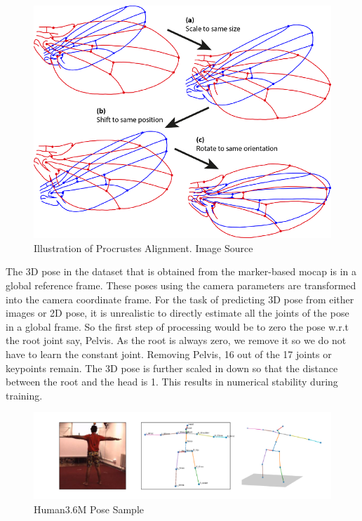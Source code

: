 \begin{figure}[!h]
    \centering
    \includegraphics[scale=0.8]{figures/background/Procrustes_superimposition.png}
    \caption{Illustration of Procrustes Alignment. Image Source \cite{Procrustes}}
    \label{fig:procrustes}
\end{figure}


The 3D pose in the dataset that is obtained from the marker-based \ac{mocap} is in a global reference frame. These poses using the camera parameters are transformed into the camera coordinate frame. For the task of predicting 3D pose from either images or 2D pose, it is unrealistic to directly estimate all the joints of the pose in a global frame. So the first step of processing would be to zero the pose w.r.t the root joint say, Pelvis. As the root is always zero, we remove it so we do not have to learn the constant joint. Removing Pelvis, 16 out of the 17 joints or keypoints remain. The 3D pose is further scaled in down so that the distance between the root and the head is 1. This results in numerical stability during training.

\begin{figure}[h]
    \centering
    \includegraphics[width=\textwidth]{figures/h36_viz/h36poses.png}
    \caption{Human3.6M Pose Sample}
    \label{fig:h36_poses}
\end{figure}

